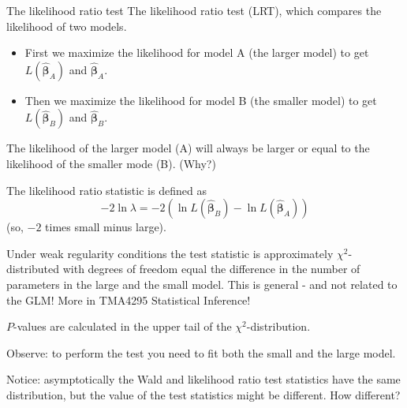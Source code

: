 \documentclass[
  ignorenonframetext,
]{beamer}
\providecommand{\tightlist}{%
  \setlength{\itemsep}{0pt}\setlength{\parskip}{0pt}}
\begin{document}
\begin{frame}
\begin{block}{The likelihood ratio test}
\label{the-likelihood-ratio-test}
The likelihood ratio test (LRT), which compares the likelihood of two
models.

\begin{itemize}
\tightlist
\item
  First we maximize the likelihood for model A (the larger model) to get
  \(L(\hat{\boldsymbol{\beta}}_A)\) and \(\hat{\boldsymbol{\beta}}_A\).
\item
  Then we maximize the likelihood for model B (the smaller model) to get
  \(L(\hat{\boldsymbol{\beta}}_B)\) and \(\hat{\boldsymbol{\beta}}_B\).
\end{itemize}
\end{block}
\end{frame}

\begin{frame}
The likelihood of the larger model (A) will always be larger or equal to
the likelihood of the smaller mode (B). (Why?)

The likelihood ratio statistic is defined as
\[- 2\ln \lambda=-2(\ln L(\hat{\boldsymbol{\beta}}_B)-\ln L(\hat{\boldsymbol{\beta}}_A)) \]
(so, \(-2\) times small minus large).
\end{frame}

\begin{frame}
Under weak regularity conditions the test statistic is approximately
\(\chi^2\)-distributed with degrees of freedom equal the difference in
the number of parameters in the large and the small model. This is
general - and not related to the GLM! More in TMA4295 Statistical
Inference!

\(P\)-values are calculated in the upper tail of the
\(\chi^2\)-distribution.

Observe: to perform the test you need to fit both the small and the
large model.

Notice: asymptotically the Wald and likelihood ratio test statistics
have the same distribution, but the value of the test statistics might
be different. How different?
\end{frame}
\end{document}
